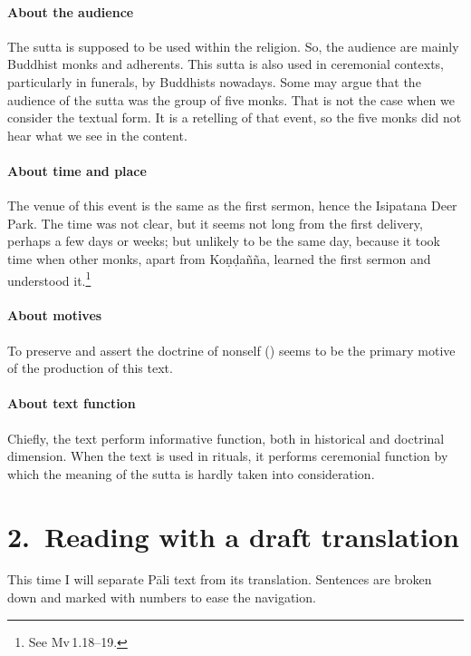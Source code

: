 \paragraph*{About the audience} The sutta is supposed to be used within the religion. So, the audience are mainly Buddhist monks and adherents. This sutta is also used in ceremonial contexts, particularly in funerals, by Buddhists nowadays. Some may argue that the audience of the sutta was the group of five monks. That is not the case when we consider the textual form. It is a retelling of that event, so the five monks did not hear what we see in the content.

\paragraph*{About time and place} The venue of this event is the same as the first sermon, hence the Isipatana Deer Park. The time was not clear, but it seems not long from the first delivery, perhaps a few days or weeks; but unlikely to be the same day, because it took time when other monks, apart from Ko\d n\d da\~n\~na, learned the first sermon and understood it.\footnote{See Mv\,1.18--19.}

\paragraph*{About motives} To preserve and assert the doctrine of nonself () seems to be the primary motive of the production of this text.

\paragraph*{About text function} Chiefly, the text perform informative function, both in historical and doctrinal dimension. When the text is used in rituals, it performs ceremonial function by which the meaning of the sutta is hardly taken into consideration.

{}
\section*{2.\ Reading with a draft translation}

This time I will separate P\=ali text from its translation. Sentences are broken down and marked with numbers to ease the navigation.

\bigskip
\begin{center}
\textbf{}\par
\end{center}

